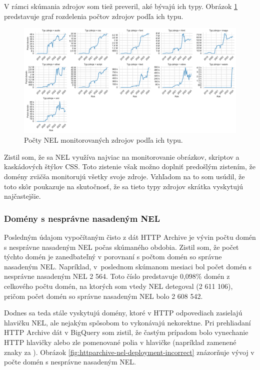 V rámci skúmania zdrojov som tiež preveril, aké bývajú ich typy.
Obrázok \ref{fig:httparchive-nel-resource-types-dist} predstavuje graf rozdelenia počtov zdrojov podľa ich typu.

\begin{figure}[!htb]
\begin{center}
 \includegraphics[scale=0.447]{obrazky-figures/httparchive_nel_resource_types_dist.pdf}
 \caption{Počty NEL monitorovaných zdrojov podľa ich typu.}
 \label{fig:httparchive-nel-resource-types-dist}
\end{center}
\end{figure}

Zistil som, že sa NEL využíva najviac na monitorovanie obrázkov, skriptov a kaskádových štýlov CSS.
Toto zistenie však možno doplniť predošlým zistením, že domény zväčša monitorujú všetky svoje zdroje.
Vzhľadom na to som usúdil, že toto skôr poukazuje na skutočnosť, že sa tieto typy zdrojov skrátka vyskytujú najčastejšie.

\subsubsection{Domény s nesprávne nasadeným NEL}

Posledným údajom vypočítaným čisto z dát HTTP Archive je vývin počtu domén s nesprávne nasadeným NEL počas skúmaného obdobia.
Zistil som, že počet týchto domén je zanedbateľný v porovnaní s počtom domén so správne nasadeným NEL.
Napríklad, \mbox{v poslednom} skúmanom mesiaci bol počet domén s nesprávne nasadeným NEL 2 564. 
Toto číslo predstavuje 0,098\% domén z celkového počtu domén, na ktorých som vtedy NEL detegoval (2 611 106), pričom počet domén so správne nasadeným NEL bolo 2 608 542.

Dodnes sa teda stále vyskytujú domény, ktoré v HTTP odpovediach zasielajú hlavičku NEL, ale nejakým spôsobom to vykonávajú nekorektne.
Pri prehliadaní HTTP Archive dát v BigQuery som zistil, že častým prípadom bolo vynechanie HTTP hlavičky  alebo zle pomenované polia v hlavičke  (napríklad zamenené znaky  za ). 
Obrázok \ref{fig:httparchive-nel-deployment-incorrect} znázorňuje vývoj v počte domén s nesprávne nasadeným NEL.

